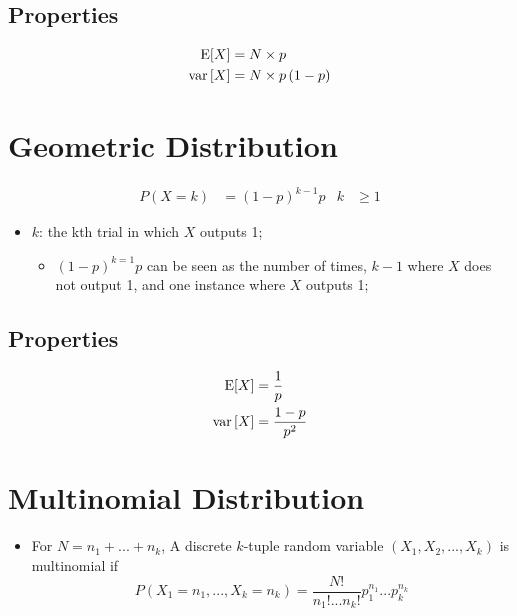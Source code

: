   \subsection{Properties}
  
    \begin{align}
      \operatorname{E}[X] &= N \times p \\
      \operatorname{var} \left[ X \right] &= N \times p \left( 1 - p \right)
    \end{align}
  
\section{Geometric Distribution}

  \begin{align}
    P (X = k) &= (1 - p)^{k - 1} p & k &\ge 1
  \end{align}

  \begin{itemize}
    \item $ k $: the kth trial in which $ X $ outputs 1;
    \begin{itemize}
      \item $ (1 - p)^{k = 1} p $ can be seen as the number of times, $ k - 1 $ where $ X $ does not output 1, and one instance where $ X $ outputs 1;
    \end{itemize}
  \end{itemize}
  
  \subsection{Properties}
  
    \begin{align}
      \operatorname{E}[X] &= \frac{1}{p} \\
      \operatorname{var} \left[ X \right] &= \frac{1 - p}{p^{2}}
    \end{align}

\section{Multinomial Distribution}

  \begin{itemize}
    \item For $ N = n_{1} + ... + n_{k} $, A discrete $ k $-tuple random variable $ \left( X_{1}, X_{2}, ..., X_{k} \right) $ is multinomial if 
    \begin{equation}
      P \left( X_{1} = n_{1}, ..., X_{k} = n_{k} \right) = \frac{ N! }{ n_{1}! ... n_{k}! } p_{1}^{n_{1}} ... p_{k}^{n_{k}}
    \end{equation}
  \end{itemize}
    
